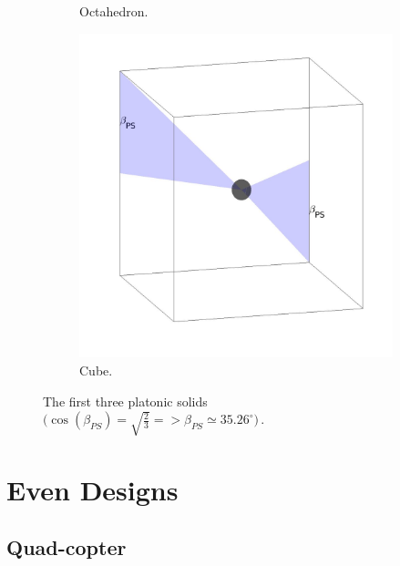 \begin{figure}[!h]
\begin{subfigure}[b]{0.27\textwidth}
    \caption{Octahedron.} \label{fig:octahedron}
  \end{subfigure}
  \hspace*{\fill} %
  \begin{subfigure}[b]{0.26\textwidth}
    \includegraphics[width=\linewidth]{images/cube.jpg}
    \caption{Cube.} \label{fig:cube}
  \end{subfigure}
  \caption{The first three platonic solids $\big(\cos(\beta_{PS}) = \sqrt{\frac{2}{3}}
  =>  \beta_{PS} \simeq 35.26^{\circ}\big)\, .$}
  \label{fig:platonic_solid}
\end{figure}



\section{Even Designs}
\label{sec:even_designs}

\subsection{Quad-copter}
\label{sec:quad_copter}

